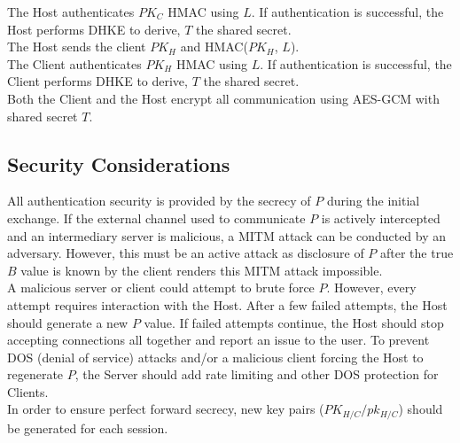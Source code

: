\documentclass{article}
\begin{document}
    The Host authenticates $PK_C$ HMAC using $L$. If authentication is
    successful, the Host performs DHKE to derive, $T$ the shared secret.\\

    The Host sends the client $PK_H$ and HMAC($PK_H$, $L$).\\

    The Client authenticates $PK_H$ HMAC using $L$. If authentication is
    successful, the Client performs DHKE to derive, $T$ the shared secret.\\

    Both the Client and the Host encrypt all communication using AES-GCM with shared
    secret $T$.\\ %

    \subsection{Security Considerations}

    All authentication security is provided by the secrecy of $P$ during the initial
    exchange. If the external channel used to communicate $P$ is actively
    intercepted and an intermediary server is malicious, a MITM attack can be
    conducted by an adversary. However, this must be an active attack as disclosure
    of $P$ after the true $B$ value is known by the client renders this MITM attack
    impossible.\\

    A malicious server or client could attempt to brute force $P$. However, every
    attempt requires interaction with the Host. After a few failed attempts, the
    Host should generate a new $P$ value. If failed attempts continue, the Host
    should stop accepting connections all together and report an issue to the user.
    To prevent DOS (denial of service) attacks and/or a malicious client forcing the
    Host to regenerate $P$, the Server should add rate limiting and other DOS
    protection for Clients.\\

    In order to ensure perfect forward secrecy, new key pairs
    ($PK_{H/C}/pk_{H/C}$) should be generated for each session.
\end{document}
